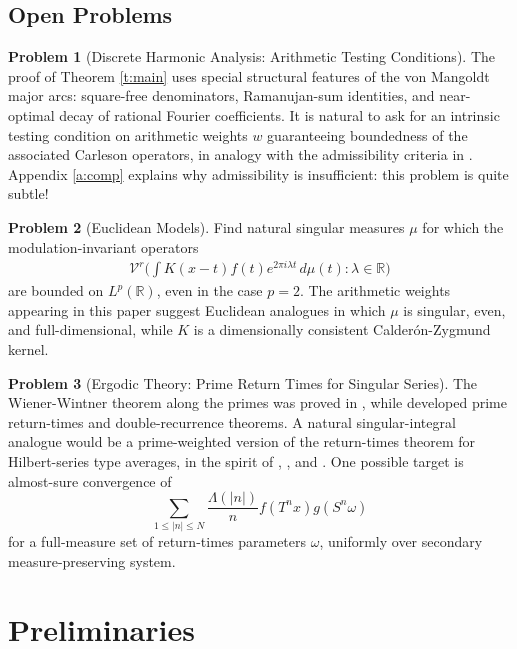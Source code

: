 \documentclass[12pt]{amsart}
\numberwithin{equation}{section}
\theoremstyle{definition}
\newtheorem{problem}{Problem}
\begin{document}
\subsection{Open Problems}
\begin{problem}[Discrete Harmonic Analysis: Arithmetic Testing Conditions]
The proof of Theorem \ref{t:main} uses special structural features of the
von Mangoldt major arcs: square-free denominators, Ramanujan-sum identities, and
near-optimal decay of rational Fourier coefficients.  It is natural to ask for an
intrinsic testing condition on arithmetic weights \(w\) guaranteeing boundedness of
the associated Carleson operators, in analogy with the admissibility criteria in
\cite{FKT1,FKT2}.  Appendix \ref{a:comp} explains why admissibility is insufficient: this problem is quite subtle!
\end{problem}

\begin{problem}[Euclidean Models]
Find natural singular measures \(\mu\) for which the modulation-invariant operators
\begin{align}
   \mathcal{V}^r\bigg(
   \int K(x-t)f(t)e^{2\pi i\lambda t}\,d\mu(t)
   :\lambda\in\mathbb R
   \bigg)
\end{align}
are bounded on \(L^p(\mathbb R)\), even in the case \(p=2\).  The arithmetic weights
appearing in this paper suggest Euclidean analogues in which \(\mu\) is singular,
even, and full-dimensional, while \(K\) is a dimensionally consistent
Calder\'on-Zygmund kernel.
\end{problem}

\begin{problem}[Ergodic Theory: Prime Return Times for Singular Series]
The Wiener-Wintner theorem along the primes was proved in \cite{F+}, while
\cite{FKT1,FKT2} developed prime return-times and double-recurrence theorems.  A
natural singular-integral analogue would be a prime-weighted version of the
return-times theorem for Hilbert-series type averages, in the spirit of
\cite[Theorem 3.4]{D}, \cite[Theorem 3.10]{D}, and \cite[Corollary 3.11]{D}.  One
possible target is almost-sure convergence of
\[
    \sum_{1\leq |n|\leq N}
    \frac{\Lambda(|n|)}{n}
    f(T^n x)g(S^n\omega)
\]
for a full-measure set of return-times parameters \(\omega\), uniformly over
secondary measure-preserving system.
\end{problem}



\section{Preliminaries}\label{s:Prelim}
\end{document}
